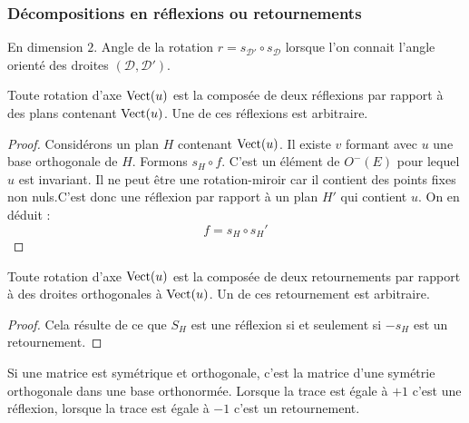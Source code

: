 \subsubsection{Décompositions en réflexions ou retournements}
En dimension $2$. Angle de la rotation $r=s_{\mathcal{D}'}\circ s_{\mathcal{D}}$  lorsque l'on connait l'angle orienté des droites $(\mathcal D , \mathcal D')$.
\begin{prop}
 Toute rotation d'axe $\mathop{\mathrm{Vect}}(u)$ est la composée de deux réflexions par rapport à des plans contenant $\mathop{\mathrm{Vect}}(u)$. Une de ces réflexions est arbitraire.
\end{prop}
\begin{proof}
 Considérons un plan $H$ contenant $\mathop{\mathrm{Vect}}(u)$. Il existe $v$ formant avec $u$ une base orthogonale de $H$. Formons $s_H\circ f$. C'est un élément de $O^-(E)$ pour lequel $u$ est invariant. Il ne peut être une rotation-miroir car il contient des points fixes non nuls.C'est donc une réflexion par rapport à un plan $H'$ qui contient $u$. On en déduit :
\begin{displaymath}
 f = s_H \circ s_H'
\end{displaymath}
\end{proof}
\begin{prop}
 Toute rotation d'axe $\mathop{\mathrm{Vect}}(u)$ est la composée de deux retournements par rapport à des droites orthogonales à $\mathop{\mathrm{Vect}}(u)$. Un de ces retournement est arbitraire.
\end{prop}
\begin{proof}
 Cela résulte de ce que $S_H$ est une réflexion si et seulement si $-s_H$ est un retournement. 
\end{proof}
\begin{prop}
 Si une matrice est symétrique et orthogonale, c'est la matrice d'une symétrie orthogonale dans une base orthonormée. Lorsque la trace est égale à $+1$ c'est une réflexion, lorsque la trace est égale à $-1$ c'est un retournement.
\end{prop}


